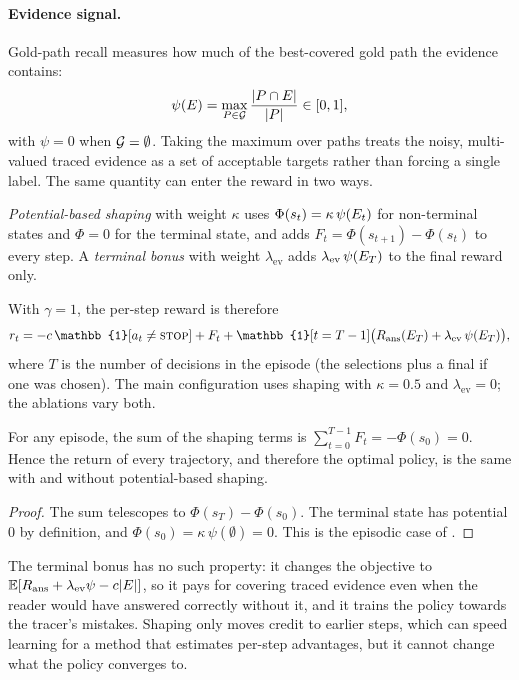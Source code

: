 \paragraph{Evidence signal.} Gold-path recall measures how much of the best-covered gold path the evidence contains:
\begin{equation}
  \psi(E)=\max_{P\in\mathcal{G}}\frac{|P\cap E|}{|P|}\in[0,1],
  \label{eq:psi}
\end{equation}
with $\psi=0$ when $\mathcal{G}=\emptyset$. Taking the maximum over paths treats the noisy, multi-valued traced evidence as a set of acceptable targets rather than forcing a single label. The same quantity can enter the reward in two ways.

\begin{definition}
\emph{Potential-based shaping} with weight $\kappa$ uses $\Phi(s_t)=\kappa\,\psi(E_t)$ for non-terminal states and $\Phi=0$ for the terminal state, and adds $F_t=\Phi(s_{t+1})-\Phi(s_t)$ to every step. A \emph{terminal bonus} with weight $\lambda_{\mathrm{ev}}$ adds $\lambda_{\mathrm{ev}}\,\psi(E_T)$ to the final reward only.
\end{definition}

With $\gamma=1$, the per-step reward is therefore
\begin{equation}
  r_t=-c\,\mathbb{1}[a_t\neq\STOP]+F_t+\mathbb{1}[t=T-1]\big(R_{\mathrm{ans}}(\evid_T)+\lambda_{\mathrm{ev}}\,\psi(\evid_T)\big),
  \label{eq:reward}
\end{equation}
where $T$ is the number of decisions in the episode (the selections plus a final \STOP{} if one was chosen). The main configuration uses shaping with $\kappa=0.5$ and $\lambda_{\mathrm{ev}}=0$; the ablations vary both.

\begin{proposition}
\label{prop:invariance}
For any episode, the sum of the shaping terms is $\sum_{t=0}^{T-1}F_t=-\Phi(s_0)=0$. Hence the return of every trajectory, and therefore the optimal policy, is the same with and without potential-based shaping.
\end{proposition}
\begin{proof}
The sum telescopes to $\Phi(s_T)-\Phi(s_0)$. The terminal state has potential $0$ by definition, and $\Phi(s_0)=\kappa\,\psi(\emptyset)=0$. This is the episodic case of \citet{ng1999policy}.
\end{proof}

The terminal bonus has no such property: it changes the objective to $\mathbb{E}[R_{\mathrm{ans}}+\lambda_{\mathrm{ev}}\psi-c|E|]$, so it pays for covering traced evidence even when the reader would have answered correctly without it, and it trains the policy towards the tracer's mistakes. Shaping only moves credit to earlier steps, which can speed learning for a method that estimates per-step advantages, but it cannot change what the policy converges to.

